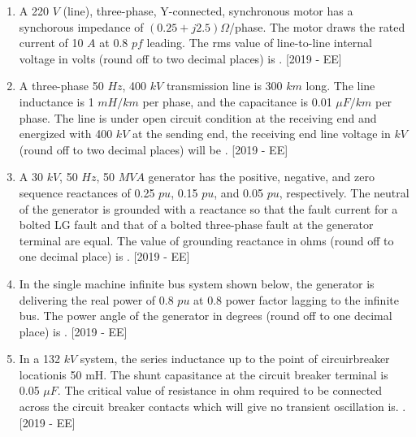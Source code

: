 \documentclass[journal]{IEEEtran}
\begin{document}
\begin{enumerate}
\item A 220 $V$ (line), three-phase, Y-connected, synchronous motor has a synchorous impedance of $(0.25 + j2.5)\Omega$/phase. The motor draws the rated current of 10 $A$ at 0.8 $pf$ leading. The rms value of line-to-line internal voltage in volts (round off to two decimal places) is \underline{\hspace{3cm}}. \hfill{[2019 - EE]}
\item A three-phase 50 $Hz$, 400 $kV$ transmission line is 300 $km$ long. The line inductance is 1 $mH/km$ per phase, and the capacitance is 0.01 $\mu F/km$ per phase. The line is under open circuit condition at the receiving end and energized with 400 $kV$ at the sending end, the receiving end line voltage in $kV$ (round off to two decimal places) will be \underline{\hspace{3cm}}. \hfill{[2019 - EE]}
\item A 30 $kV$, 50 $Hz$, 50 $MVA$ generator has the positive, negative, and zero sequence reactances of 0.25 $pu$, 0.15 $pu$, and 0.05 $pu$, respectively. The neutral of the generator is grounded with a reactance so that the fault current for a bolted LG fault and that of a bolted three-phase fault at the generator terminal are equal. The value of grounding reactance in ohms (round off to one decimal place) is \underline{\hspace{3cm}}. \hfill{[2019 - EE]}
\item In the single machine infinite bus system shown below, the generator is delivering the real power of 0.8 $pu$ at 0.8 power factor lagging to the infinite bus. The power angle of the generator in degrees (round off to one decimal place) is \underline{\hspace{3cm}}. \hfill{[2019 - EE]}
    \begin{center}
        
    \end{center}
    \item In a 132 $kV$ system, the series inductance up to the point of circuirbreaker locationis 50 mH. The shunt capasitance at the circuit breaker terminal is 0.05 $\mu F$. The critical value of resistance in ohm required to be connected across the circuit breaker contacts which will give no transient oscillation is. \underline{\hspace{3cm}}.\hfill{[2019 - EE]}
\end{enumerate}
\end{document}
